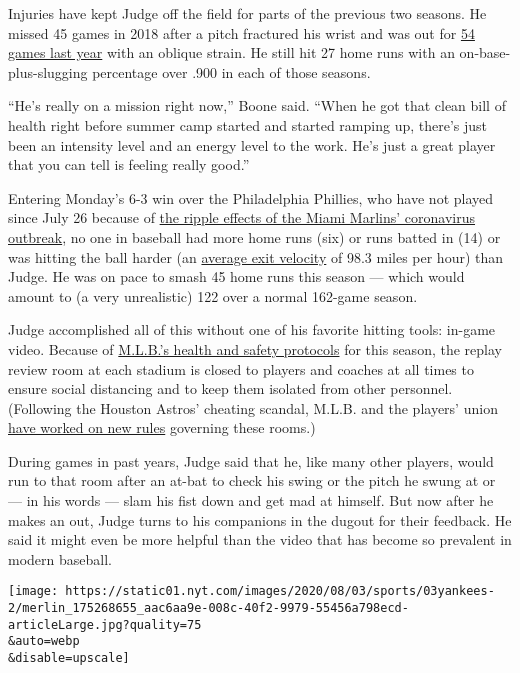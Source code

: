 Injuries have kept Judge off the field for parts of the previous two
seasons. He missed 45 games in 2018 after a pitch fractured his wrist
and was out for
\href{https://www.nytimes.com/2019/06/21/sports/aaron-judge-yankees.html}{54
games last year} with an oblique strain. He still hit 27 home runs with
an on-base-plus-slugging percentage over .900 in each of those seasons.

``He's really on a mission right now,'' Boone said. ``When he got that
clean bill of health right before summer camp started and started
ramping up, there's just been an intensity level and an energy level to
the work. He's just a great player that you can tell is feeling really
good.''

Entering Monday's 6-3 win over the Philadelphia Phillies, who have not
played since July 26 because of
\href{https://www.nytimes.com/2020/07/29/sports/baseball/yankees-schedule.html}{the
ripple effects of the Miami Marlins' coronavirus outbreak}, no one in
baseball had more home runs (six) or runs batted in (14) or was hitting
the ball harder (an
\href{https://baseballsavant.mlb.com/leaderboard/statcast?type=batter\&year=2020\&position=\&team=\&min=q\&sort=6\&sortDir=asc}{average
exit velocity} of 98.3 miles per hour) than Judge. He was on pace to
smash 45 home runs this season --- which would amount to (a very
unrealistic) 122 over a normal 162-game season.

Judge accomplished all of this without one of his favorite hitting
tools: in-game video. Because of
\href{https://www.nytimes.com/2020/06/24/sports/baseball/mlb-coronavirus-rules.html}{M.L.B.'s
health and safety protocols} for this season, the replay review room at
each stadium is closed to players and coaches at all times to ensure
social distancing and to keep them isolated from other personnel.
(Following the Houston Astros' cheating scandal, M.L.B. and the players'
union
\href{https://www.nytimes.com/2020/02/24/sports/baseball/astros-cheating-scandal.html}{have
worked on new rules} governing these rooms.)

During games in past years, Judge said that he, like many other players,
would run to that room after an at-bat to check his swing or the pitch
he swung at or --- in his words --- slam his fist down and get mad at
himself. But now after he makes an out, Judge turns to his companions in
the dugout for their feedback. He said it might even be more helpful
than the video that has become so prevalent in modern baseball.

\texttt{[image: https://static01.nyt.com/images/2020/08/03/sports/03yankees-2/merlin\_175268655\_aac6aa9e-008c-40f2-9979-55456a798ecd-articleLarge.jpg?quality=75\\\&auto=webp\\\&disable=upscale]}

